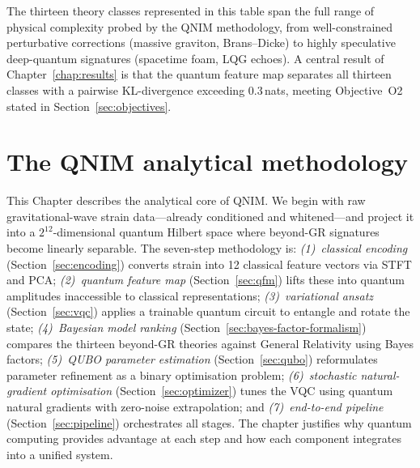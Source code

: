 \documentclass[11pt,a4paper, english]{book}
\theoremstyle{plain}
\theoremstyle{definition}
\numberwithin{equation}{chapter}
\numberwithin{figure}{chapter}
\numberwithin{table}{chapter}
\begin{document}
The thirteen theory classes represented in this table span the full range of
physical complexity probed by the QNIM methodology, from well-constrained
perturbative corrections (massive graviton, Brans--Dicke) to highly
speculative deep-quantum signatures (spacetime foam, LQG echoes).  A
central result of Chapter~\ref{chap:results} is that the quantum feature
map separates all thirteen classes with a pairwise KL-divergence exceeding
$0.3$\,nats, meeting Objective~O2 stated in
Section~\ref{sec:objectives}.



\chapter{The QNIM analytical methodology}
\label{chap:methodology-qnim}

This Chapter describes the analytical core of QNIM. We begin with raw gravitational-wave
strain data—already conditioned and whitened—and project it into a $2^{12}$-dimensional
quantum Hilbert space where beyond-GR signatures become linearly separable.
The seven-step methodology is: \emph{(1)~classical encoding} (Section~\ref{sec:encoding})
converts strain into 12 classical feature vectors via STFT and PCA; 
\emph{(2)~quantum feature map} (Section~\ref{sec:qfm}) lifts these into quantum 
amplitudes inaccessible to classical representations; \emph{(3)~variational ansatz} 
(Section~\ref{sec:vqc}) applies a trainable quantum circuit to entangle and rotate 
the state; \emph{(4)~Bayesian model ranking} (Section~\ref{sec:bayes-factor-formalism}) 
compares the thirteen beyond-GR theories against General Relativity using Bayes factors; 
\emph{(5)~QUBO parameter estimation} (Section~\ref{sec:qubo}) reformulates parameter 
refinement as a binary optimisation problem; \emph{(6)~stochastic natural-gradient optimisation} 
(Section~\ref{sec:optimizer}) tunes the VQC using 
quantum natural gradients with zero-noise extrapolation; and \emph{(7)~end-to-end pipeline} (Section~\ref{sec:pipeline}) 
orchestrates all stages. The chapter justifies why quantum computing provides advantage 
at each step and how each component integrates into a unified system.
\end{document}
